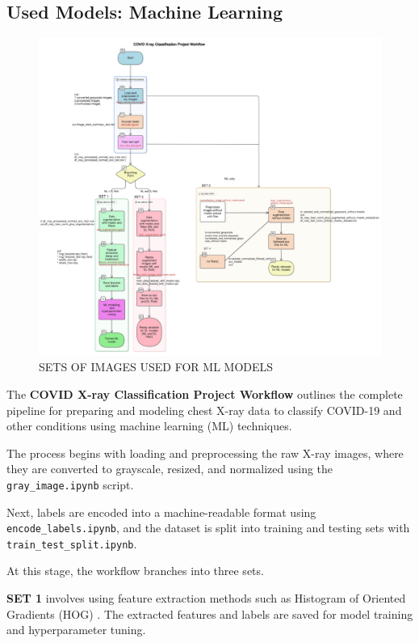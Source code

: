 \documentclass{article}
\begin{document}
\subsection{Used Models: Machine Learning}
\begin{figure}[ht] %
    \centering
    \includegraphics[width=1.0\linewidth]{diagram-export-5-8-2025-4_05_06-PM.png}
    \caption{SETS OF IMAGES USED FOR ML MODELS}
    \label{WORKFLOW}
\end{figure}
The \textbf{COVID X-ray Classification Project Workflow} outlines the complete pipeline for preparing and modeling chest X-ray data to classify COVID-19 and other conditions using machine learning (ML) techniques.

The process begins with loading and preprocessing the raw X-ray images, where they are converted to grayscale, resized, and normalized using the \texttt{gray\_image.ipynb} script.

Next, labels are encoded into a machine-readable format using \texttt{encode\_labels.ipynb}, and the dataset is split into training and testing sets with \texttt{train\_test\_split.ipynb}.

At this stage, the workflow branches into three sets.

\textbf{SET 1} involves using feature extraction methods such as Histogram of Oriented Gradients (HOG) . The extracted features and labels are saved for model training and hyperparameter tuning.
\end{document}
